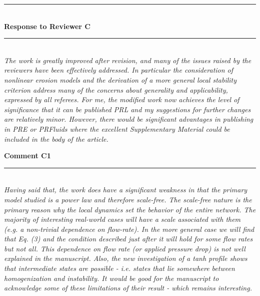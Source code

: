 \documentclass{article}
\newcommand{\Hline}{\rule{\linewidth}{.1mm}}
\newcommand{\Question}[1]{\noindent \color{black}\emph{#1}\normalcolor}
\newcommand{\Answer}[1]{\noindent {\color{blue}{ #1}}\normalcolor}
\begin{document}
\newpage

\vspace{10 mm}
\noindent
\Hline \\
\textbf{Response to Reviewer C} \\
\Hline
\\


\Question{The work is greatly improved after revision, and many of the issues
raised by the reviewers have been effectively addressed. In particular
the consideration of nonlinear erosion models and the derivation of a
more general local stability criterion address many of the concerns
about generality and applicability, expressed by all referees.
\newline
For me, the modified work now achieves the level of significance that
it can be published PRL and my suggestions for further changes are
relatively minor. However, there would be significant advantages in
publishing in PRE or PRFluids where the excellent Supplementary
Material could be included in the body of the article.\newline}


\Answer{We thank the reviewer for their thoughtful comments.}



\vspace{0.5cm}
\textbf{Comment C1}
\noindent \vspace{-0.2cm}\\ \Hline\\

\Question{Having said that, the work does have a significant weakness in that
the primary model studied is a power law and therefore scale-free. The
scale-free nature is the primary reason why the local dynamics set the
behavior of the entire network. The majority of interesting real-world
cases will have a scale associated with them (e.g. a non-trivial
dependence on flow-rate). In the more general case we will find that
Eq. (3) and the condition described just after it will hold for some
flow rates but not all. This dependence on flow rate (or applied
pressure drop) is not well explained in the manuscript. Also, the new investigation of a tanh profile shows that intermediate states are
possible - i.e. states that lie somewhere between homogenization and
instability. It would be good for the manuscript to acknowledge some
of these limitations of their result - which remains interesting.
\newline}
\end{document}
